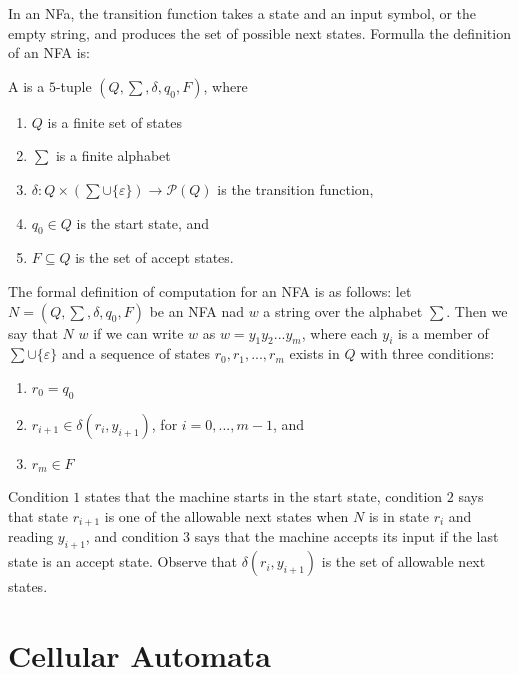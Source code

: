 \documentclass[12pt, a4paper, oneside, openright, titlepage]{book}
\begin{document}
In an NFa, the transition function takes a state and an input symbol, or the empty string, and produces the set of possible next states. Formulla the definition of an NFA is: 
\begin{defn}
    A  is a $5$-tuple $(Q,\sum,\delta,q_0,F)$, where \begin{enumerate}
        \item $Q$ is a finite set of states
        \item $\sum$ is a finite alphabet
        \item $\delta:Q\times (\sum\cup\{\varepsilon\})\rightarrow \mathcal{P}(Q)$ is the transition function,
        \item $q_0 \in Q$ is the start state, and 
        \item $F \subseteq Q$ is the set of accept states.
    \end{enumerate}
\end{defn}

The formal definition of computation for an NFA is as follows: let $N = (Q,\sum,\delta,q_0,F)$ be an NFA nad $w$ a string over the alphabet $\sum$. Then we say that $N$  $w$ if we can write $w$ as $w = y_1y_2...y_m$, where each $y_i$ is a member of $\sum\cup \{\varepsilon\}$ and a sequence of states $r_0,r_1,...,r_m$ exists in $Q$ with three conditions: \begin{enumerate}
    \item $r_0 = q_0$
    \item $r_{i+1} \in \delta(r_i,y_{i+1})$, for $i = 0,...,m-1$, and 
    \item $r_m \in F$
\end{enumerate}
Condition $1$ states that the machine starts in the start state, condition $2$ says that state $r_{i+1}$ is one of the allowable next states when $N$ is in state $r_i$ and reading $y_{i+1}$, and condition $3$ says that the machine accepts its input if the last state is an accept state. Observe that $\delta(r_i,y_{i+1})$ is the set of allowable next states.













\section{Cellular Automata}
\end{document}

